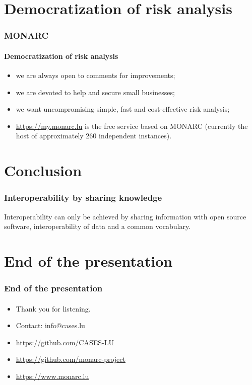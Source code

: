 \documentclass[]{beamer}
\begin{document}
\section{Democratization of risk analysis}
\begin{frame}
    \frametitle{MONARC}
    \framesubtitle{Democratization of risk analysis}
    \begin{center}
        \begin{itemize}
            \item we are always open to comments for improvements;
            \item we are devoted to help and secure small businesses;
            \item we want uncompromising simple, fast and cost-effective risk analysis;
            \item \url{https://my.monarc.lu} is the free service based on MONARC (currently the host of approximately 260 independent instances).
        \end{itemize}
    \end{center}
\end{frame}



\section*{Conclusion}
\begin{frame}
    \frametitle{Interoperability by sharing knowledge}
    \begin{center}
        Interoperability can only be achieved by sharing information with open source
        software, interoperability of data and a common vocabulary.
    \end{center}
\end{frame}


%
%
\section*{End of the presentation}
\begin{frame}
    \frametitle{End of the presentation}
    \framesubtitle{}
    \begin{center}
        \begin{itemize}
            \item Thank you for listening.
            \item Contact: info@cases.lu
            \item \url{https://github.com/CASES-LU}
            \item \url{https://github.com/monarc-project}
            \item \url{https://www.monarc.lu}
        \end{itemize}
    \end{center}
\end{frame}
\end{document}
